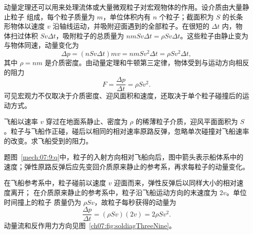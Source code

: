 {动量定理还可以用来处理流体或大量微观粒子对宏观物体的作用。设介质由大量静止粒子
组成，每个粒子质量为 $m$，单位体积内有 $n$ 个粒子；截面积为 $S$ 的长条形物体以速度
$v$ 沿轴线运动，并吸附迎面遇到的全部粒子。在很短的 $\Delta t$ 内，物体扫过体积
$Sv\Delta t$，吸附粒子的总质量为 $nmSv\Delta t=\rho Sv\Delta t$。这些粒子由静止变为
与物体同速，动量变化为
\begin{equation}
 \Delta p=(nSv\Delta t)mv=nmSv^2\Delta t
 =\rho Sv^2\Delta t,
\end{equation}
其中 $\rho=nm$ 是介质密度。由动量定理和牛顿第三定律，物体受到与运动方向相反的阻力
\begin{equation}
 F=\frac{\Delta p}{\Delta t}=\rho Sv^2.
\end{equation}
可见宏观力不仅取决于介质密度、迎风面积和速度，还取决于单个粒子碰撞后的运动方式。

\begin{origexamplebox}{}\label{ch07:ex:s07-3-9}
飞船以速率 $v$ 穿过在地面系静止、密度为 $\rho$ 的稀薄粒子介质，迎风平面面积为 $S$。粒子与飞船作正碰，碰后以相同的相对速率原路反弹，忽略单次碰撞对飞船速率的改变。求飞船受到的阻力。

\begin{qualityfigure}
\label{mech:07:9:q}
\end{qualityfigure}
\end{origexamplebox}

\begin{xesolution}题图~\ref{mech:07:9:q}中，粒子的入射方向相对飞船向后，图中箭头表示船体系中的速度；弹性原路反弹后应先变回介质原来静止的参考系，再求每粒子的动量变化。

在飞船参考系中，粒子碰前以速度 $v$ 迎面而来，弹性反弹后以同样大小的相对速度离开；
在介质原来静止的参考系中，粒子沿飞船运动方向的末速度为 $2v$。单位时间撞上的粒子
质量仍为 $\rho Sv$，故粒子每秒获得的动量为
\[
 \frac{\Delta p}{\Delta t}=(\rho Sv)(2v)=2\rho Sv^2.
\]
动量流和反作用力方向见图~\ref{ch07:fig:soldiagThreeNine}。


\end{xesolution}}
